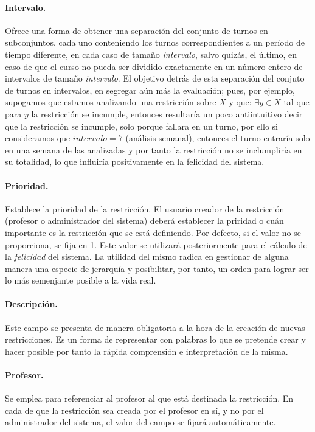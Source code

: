 \paragraph{Intervalo.}
Ofrece una forma de obtener una separación del  conjunto de turnos en subconjuntos, cada uno conteniendo los turnos correspondientes a un período de tiempo diferente, en cada caso de tamaño \textit{intervalo}, salvo quizás, el último, en caso de que el curso no pueda ser dividido exactamente en un número 
entero de intervalos de tamaño \textit{intervalo}. El objetivo detrás de esta separación del conjuto de turnos en intervalos, en segregar aún más la evaluación; pues, por ejemplo, supogamos que estamos analizando una restricción sobre $X$ y que: $\exists y \in X $ tal que para $y$ la restricción se incumple, entonces resultaría un poco antiintuitivo decir que la restricción se incumple, solo porque fallara en un turno, por ello si consideramos que $intervalo = 7$ (análisis semanal), entonces el turno entraría solo en una semana de las analizadas y por tanto la restricción no se inclumpliría en su totalidad, lo que influiría positivamente en la felicidad del sistema.

\paragraph{Prioridad.}
\label{def:priority}
Establece la prioridad de la restricción. El usuario creador de la restricción (profesor o administrador del sistema) deberá establecer la priridad o cuán importante es la restricción que se está definiendo. Por defecto, si el valor no se proporciona, se fija en 1. Este valor se utilizará posteriormente para el cálculo de la \textit{felicidad} del sistema. La utilidad del mismo radica en gestionar de alguna manera una especie de jerarquía y posibilitar, por tanto, un orden para lograr ser lo más semenjante posible a la vida real.

\paragraph{Descripción.}
Este campo se presenta de manera obligatoria a la hora de la creación de nuevas restricciones. Es un forma de representar con palabras lo que se pretende crear y hacer posible por tanto la rápida comprensión e interpretación de la misma. 

\paragraph{Profesor.}
Se emplea para referenciar al profesor al que está destinada la restricción. En cada de que la restricción sea creada por el profesor en sí, y no por el administrador del sistema, el valor del campo se fijará automáticamente. \\\\

